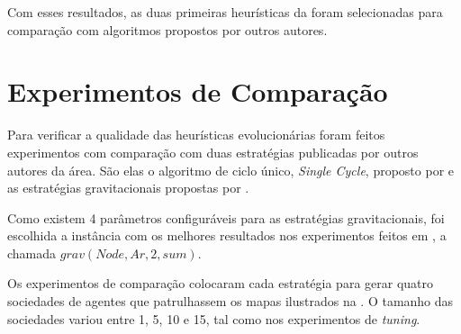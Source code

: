 Com esses resultados, as duas primeiras heurísticas da  foram 
selecionadas para comparação com algoritmos propostos por outros autores.

\section{Experimentos de Comparação}

Para verificar a qualidade das heurísticas evolucionárias foram feitos 
experimentos com comparação com duas estratégias publicadas por outros autores 
da área. São elas o algoritmo de ciclo único, \textit{Single Cycle}, proposto 
por \citep{Chevaleyre:2004:TAM:1018411.1019013} e as estratégias gravitacionais 
propostas por \citep{sampaiophd}.

Como existem 4 parâmetros configuráveis para as estratégias gravitacionais, foi 
escolhida a instância com os melhores resultados nos experimentos feitos em 
\citep{sampaiophd}, a chamada $grav(Node,Ar,2,sum)$.

Os experimentos de comparação colocaram cada estratégia para gerar quatro 
sociedades de agentes que patrulhassem os mapas ilustrados na 
. O tamanho das sociedades variou entre 1, 5, 10 e 15, tal 
como nos experimentos de \textit{tuning}.




